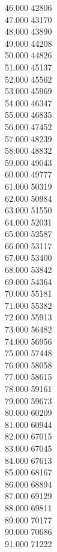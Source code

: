 { 46.000	42806 \\
 47.000	43170 \\
 48.000	43890 \\
 49.000	44208 \\
 50.000	44826 \\
 51.000	45137 \\
 52.000	45562 \\
 53.000	45969 \\
 54.000	46347 \\
 55.000	46835 \\
 56.000	47452 \\
 57.000	48239 \\
 58.000	48832 \\
 59.000	49043 \\
 60.000	49777 \\
 61.000	50319 \\
 62.000	50984 \\
 63.000	51550 \\
 64.000	52031 \\
 65.000	52587 \\
 66.000	53117 \\
 67.000	53400 \\
 68.000	53842 \\
 69.000	54364 \\
 70.000	55181 \\
 71.000	55382 \\
 72.000	55913 \\
 73.000	56482 \\
 74.000	56956 \\
 75.000	57448 \\
 76.000	58058 \\
 77.000	58615 \\
 78.000	59161 \\
 79.000	59673 \\
 80.000	60209 \\
 81.000	60944 \\
 82.000	67015 \\
 83.000	67045 \\
 84.000	67613 \\
 85.000	68167 \\
 86.000	68894 \\
 87.000	69129 \\
 88.000	69811 \\
 89.000	70177 \\
 90.000	70686 \\
 91.000	71222 \\
}
